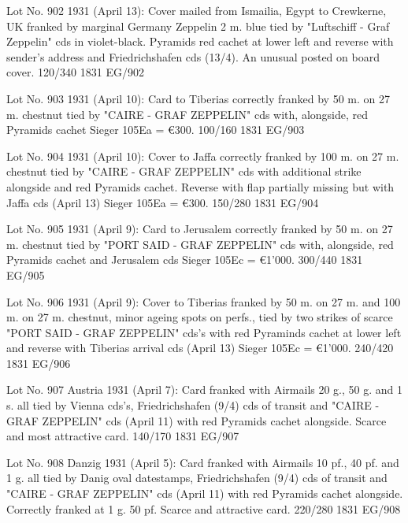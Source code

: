 \documentclass[justified]{tufte-book}
\begin{document}
%
{Lot No. 902
1931 (April 13): Cover mailed from Ismailia, Egypt to Crewkerne, UK franked by marginal Germany Zeppelin 2 m. blue tied by "Luftschiff - Graf Zeppelin" cds in violet-black. Pyramids red cachet at lower left and reverse with sender's address and Friedrichshafen cds (13/4). An unusual posted on board cover. 120/340}%
{1831}%
{EG/902}%
{}%
{}
{}%
{}

%
{Lot No. 903
1931 (April 10): Card to Tiberias correctly franked by 50 m. on 27 m. chestnut tied by "CAIRE - GRAF ZEPPELIN" cds with, alongside, red Pyramids cachet Sieger 105Ea = \euro 300. 100/160}%
{1831}%
{EG/903}%
{}%
{}
{}%
{}

%
{Lot No. 904
1931 (April 10): Cover to Jaffa correctly franked by 100 m. on 27 m. chestnut tied by "CAIRE - GRAF ZEPPELIN" cds with additional strike alongside and red Pyramids cachet. Reverse with flap partially missing but with Jaffa cds (April 13) Sieger 105Ea = \euro 300. 150/280}%
{1831}%
{EG/904}%
{}%
{}
{}%
{}

%
{Lot No. 905
1931 (April 9): Card to Jerusalem correctly franked by 50 m. on 27 m. chestnut tied by "PORT SAID - GRAF ZEPPELIN" cds with, alongside, red Pyramids cachet and Jerusalem cds Sieger 105Ec = \euro 1'000. 300/440}%
{1831}%
{EG/905}%
{}%
{}
{}%
{}

%
{Lot No. 906
1931 (April 9): Cover to Tiberias franked by 50 m. on 27 m. and 100 m. on 27 m. chestnut, minor ageing spots on perfs., tied by two strikes of scarce "PORT SAID - GRAF ZEPPELIN" cds's with red Pyraminds cachet at lower left and reverse with Tiberias arrival cds (April 13) Sieger 105Ec = \euro 1'000. 240/420}%
{1831}%
{EG/906}%
{}%
{}
{}%
{}

%
{Lot No. 907
Austria 1931 (April 7): Card franked with Airmails 20 g., 50 g. and 1 s. all tied by Vienna cds's, Friedrichshafen (9/4) cds of transit and  "CAIRE - GRAF ZEPPELIN" cds (April 11) with red Pyramids cachet alongside. Scarce and most attractive card. 140/170}%
{1831}%
{EG/907}%
{}%
{}
{}%
{}

%
{Lot No. 908
Danzig 1931 (April 5): Card franked with Airmails 10 pf., 40 pf. and 1 g. all tied by Danig oval datestamps, Friedrichshafen (9/4) cds of transit and  "CAIRE - GRAF ZEPPELIN" cds (April 11) with red Pyramids cachet alongside. Correctly franked at 1 g. 50 pf. Scarce and attractive card. 220/280}%
{1831}%
{EG/908}%
{}%
{}
{}%
{}
\end{document}
